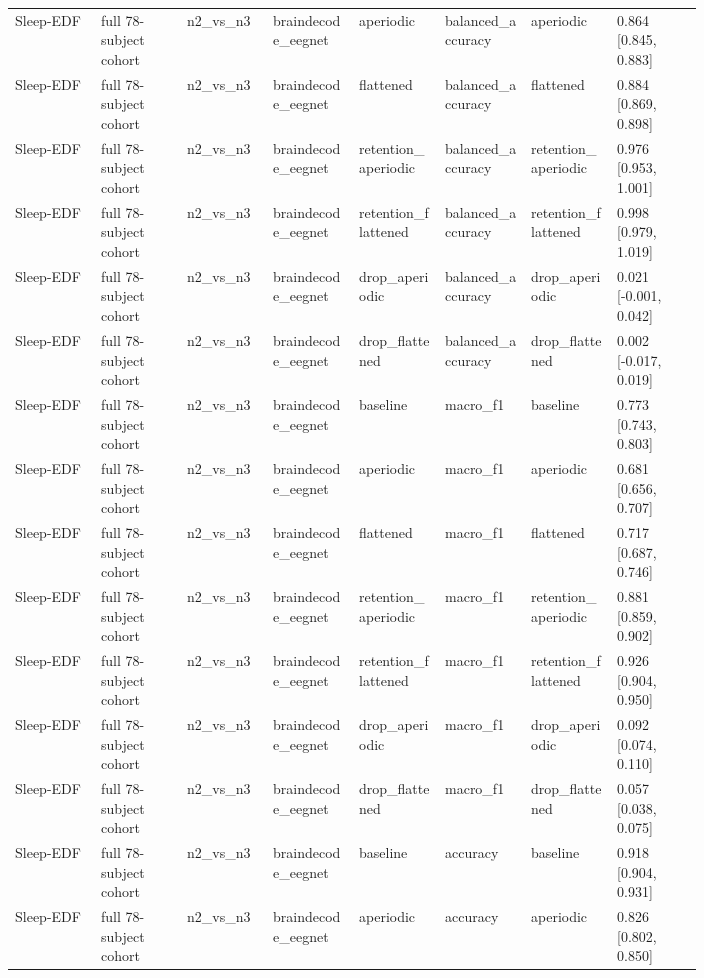 \begin{longtable}{p{0.10\linewidth}p{0.10\linewidth}p{0.10\linewidth}p{0.10\linewidth}p{0.10\linewidth}p{0.10\linewidth}p{0.10\linewidth}p{0.10\linewidth}}
Sleep-EDF & full 78-subject cohort & n2\_vs\_n3 & braindecode\_eegnet & aperiodic & balanced\_accuracy & aperiodic & 0.864 [0.845, 0.883]\\
Sleep-EDF & full 78-subject cohort & n2\_vs\_n3 & braindecode\_eegnet & flattened & balanced\_accuracy & flattened & 0.884 [0.869, 0.898]\\
Sleep-EDF & full 78-subject cohort & n2\_vs\_n3 & braindecode\_eegnet & retention\_aperiodic & balanced\_accuracy & retention\_aperiodic & 0.976 [0.953, 1.001]\\
Sleep-EDF & full 78-subject cohort & n2\_vs\_n3 & braindecode\_eegnet & retention\_flattened & balanced\_accuracy & retention\_flattened & 0.998 [0.979, 1.019]\\
Sleep-EDF & full 78-subject cohort & n2\_vs\_n3 & braindecode\_eegnet & drop\_aperiodic & balanced\_accuracy & drop\_aperiodic & 0.021 [-0.001, 0.042]\\
Sleep-EDF & full 78-subject cohort & n2\_vs\_n3 & braindecode\_eegnet & drop\_flattened & balanced\_accuracy & drop\_flattened & 0.002 [-0.017, 0.019]\\
Sleep-EDF & full 78-subject cohort & n2\_vs\_n3 & braindecode\_eegnet & baseline & macro\_f1 & baseline & 0.773 [0.743, 0.803]\\
Sleep-EDF & full 78-subject cohort & n2\_vs\_n3 & braindecode\_eegnet & aperiodic & macro\_f1 & aperiodic & 0.681 [0.656, 0.707]\\
Sleep-EDF & full 78-subject cohort & n2\_vs\_n3 & braindecode\_eegnet & flattened & macro\_f1 & flattened & 0.717 [0.687, 0.746]\\
Sleep-EDF & full 78-subject cohort & n2\_vs\_n3 & braindecode\_eegnet & retention\_aperiodic & macro\_f1 & retention\_aperiodic & 0.881 [0.859, 0.902]\\
Sleep-EDF & full 78-subject cohort & n2\_vs\_n3 & braindecode\_eegnet & retention\_flattened & macro\_f1 & retention\_flattened & 0.926 [0.904, 0.950]\\
Sleep-EDF & full 78-subject cohort & n2\_vs\_n3 & braindecode\_eegnet & drop\_aperiodic & macro\_f1 & drop\_aperiodic & 0.092 [0.074, 0.110]\\
Sleep-EDF & full 78-subject cohort & n2\_vs\_n3 & braindecode\_eegnet & drop\_flattened & macro\_f1 & drop\_flattened & 0.057 [0.038, 0.075]\\
Sleep-EDF & full 78-subject cohort & n2\_vs\_n3 & braindecode\_eegnet & baseline & accuracy & baseline & 0.918 [0.904, 0.931]\\
Sleep-EDF & full 78-subject cohort & n2\_vs\_n3 & braindecode\_eegnet & aperiodic & accuracy & aperiodic & 0.826 [0.802, 0.850]\\

\end{longtable}
